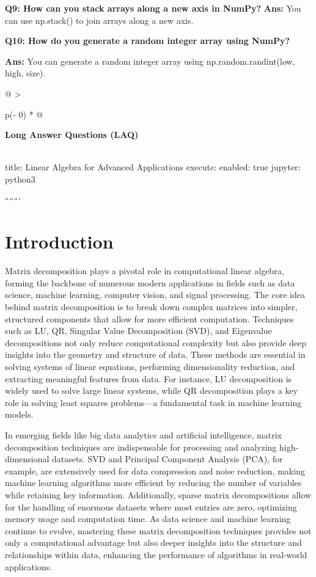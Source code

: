 \documentclass[
  letterpaper,
  DIV=11,
  numbers=noendperiod]{scrreprt}
\theoremstyle{plain}
\theoremstyle{definition}
\theoremstyle{remark}
\begin{document}
\textbf{Q9: How can you stack arrays along a new axis in NumPy?}
\textbf{Ans:} You can use np.stack() to join arrays along a new axis.

\textbf{Q10: How do you generate a random integer array using NumPy?}

\textbf{Ans:} You can generate a random integer array using
np.random.randint(low, high, size).

\begin{longtable}[]{@{}
  >{\raggedright\arraybackslash}p{(\columnwidth - 0\tabcolsep) * }@{}}
\toprule\noalign{}
\begin{minipage}[b]{\linewidth}\raggedright
\textbf{Long Answer Questions (LAQ)}
\end{minipage} \\
\midrule\noalign{}
\endhead
\bottomrule\noalign{}
\endlastfoot
title: Linear Algebra for Advanced Applications execute: enabled: true
jupyter: python3 \\
\end{longtable}

```````

\section{Introduction}\label{introduction-1}

Matrix decomposition plays a pivotal role in computational linear
algebra, forming the backbone of numerous modern applications in fields
such as data science, machine learning, computer vision, and signal
processing. The core idea behind matrix decomposition is to break down
complex matrices into simpler, structured components that allow for more
efficient computation. Techniques such as LU, QR, Singular Value
Decomposition (SVD), and Eigenvalue decompositions not only reduce
computational complexity but also provide deep insights into the
geometry and structure of data. These methods are essential in solving
systems of linear equations, performing dimensionality reduction, and
extracting meaningful features from data. For instance, LU decomposition
is widely used to solve large linear systems, while QR decomposition
plays a key role in solving least squares problems---a fundamental task
in machine learning models.

In emerging fields like big data analytics and artificial intelligence,
matrix decomposition techniques are indispensable for processing and
analyzing high-dimensional datasets. SVD and Principal Component
Analysis (PCA), for example, are extensively used for data compression
and noise reduction, making machine learning algorithms more efficient
by reducing the number of variables while retaining key information.
Additionally, sparse matrix decompositions allow for the handling of
enormous datasets where most entries are zero, optimizing memory usage
and computation time. As data science and machine learning continue to
evolve, mastering these matrix decomposition techniques provides not
only a computational advantage but also deeper insights into the
structure and relationships within data, enhancing the performance of
algorithms in real-world applications.
\end{document}
